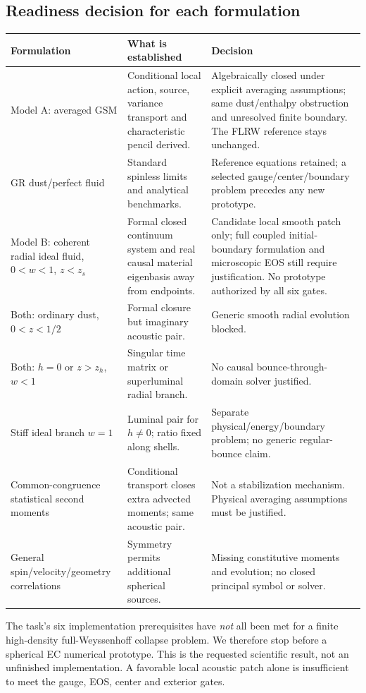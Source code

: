 \subsection{Readiness decision for each formulation}
\begin{longtable}{p{}p{}p{}}
\toprule Formulation & What is established & Decision\\\midrule\endhead
Model A: averaged GSM & Conditional local action, source, variance transport and characteristic pencil derived. & Algebraically closed under explicit averaging assumptions; same dust/enthalpy obstruction and unresolved finite boundary. The FLRW reference stays unchanged.\\
GR dust/perfect fluid & Standard spinless limits and analytical benchmarks. & Reference equations retained; a selected gauge/center/boundary problem precedes any new prototype.\\
Model B: coherent radial ideal fluid, $0<w<1$, $z<z_s$ & Formal closed continuum system and real causal material eigenbasis away from endpoints. & Candidate local smooth patch only; full coupled initial-boundary formulation and microscopic EOS still require justification. No prototype authorized by all six gates.\\
Both: ordinary dust, $0<z<1/2$ & Formal closure but imaginary acoustic pair. & Generic smooth radial evolution blocked.\\
Both: $h=0$ or $z>z_h$, $w<1$ & Singular time matrix or superluminal radial branch. & No causal bounce-through-domain solver justified.\\
Stiff ideal branch $w=1$ & Luminal pair for $h\ne0$; ratio fixed along shells. & Separate physical/energy/boundary problem; no generic regular-bounce claim.\\
Common-congruence statistical second moments & Conditional transport closes extra advected moments; same acoustic pair. & Not a stabilization mechanism. Physical averaging assumptions must be justified.\\
General spin/velocity/geometry correlations & Symmetry permits additional spherical sources. & Missing constitutive moments and evolution; no closed principal symbol or solver.\\\bottomrule
\end{longtable}
The task's six implementation prerequisites have \emph{not} all been met for a finite high-density full-Weyssenhoff collapse problem. We therefore stop before a spherical EC numerical prototype. This is the requested scientific result, not an unfinished implementation. A favorable local acoustic patch alone is insufficient to meet the gauge, EOS, center and exterior gates.

